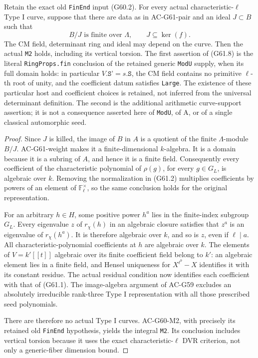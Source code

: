 \begin{theorem}
\label{AC-G61}
Retain the exact old \texttt{FinEnd} input (G60.2).
For every actual characteristic-\(\ell\) Type I curve, suppose
that there are data as in AC-G61-pair and an ideal \(J\subset B\)
such that
\[
        B/J\text{ is finite over }\Lambda,
        \qquad J\subseteq\ker(f).
 \tag{G61.8}
\]
The CM field, determinant ring and ideal may depend on the curve.
Then the actual \texttt{M2} holds, including its vertical torsion.
The first assertion of (G61.8) is the literal
\texttt{RingProps.fin} conclusion of the retained generic
\texttt{ModU} supply, when its full domain holds: in particular
\(V.\texttt{S'}=s.\texttt S\), the CM field contains no
primitive \(\ell\)-th root of unity, and the coefficient datum
satisfies \texttt{Large}.  The existence of these particular
host and coefficient choices is retained, not inferred from
the universal determinant definition.  The second is the additional arithmetic
curve-support assertion; it is not a consequence asserted here
of \texttt{ModU}, of A, or of a single classical automorphic seed.
\end{theorem}
\begin{proof}
Since \(J\) is killed, the image of \(B\) in \(A\) is a
quotient of the finite \(\Lambda\)-module \(B/J\).
AC-G61-weight makes it a finite-dimensional \(k\)-algebra.
It is a domain because it is a subring of \(A\), and hence it
is a finite field.  Consequently every coefficient of the
characteristic polynomial of \(\rho(g)\), for every
\(g\in G_L\), is algebraic over \(k\).
Removing the normalization in (G61.2) multiplies coefficients
by powers of an element of \(\mathbb F_\ell^\times\), so
the same conclusion holds for the original representation.

For an arbitrary \(h\in H\), some positive power \(h^a\)
lies in the finite-index subgroup \(G_L\).
Every eigenvalue \(z\) of \(r_\chi(h)\) in an algebraic
closure satisfies that \(z^a\) is an eigenvalue of
\(r_\chi(h^a)\).  It is therefore algebraic over \(k\),
and so is \(z\), even if \(\ell\mid a\).
All characteristic-polynomial coefficients at \(h\) are
algebraic over \(k\).  The elements of \(V=k'[[t]]\)
algebraic over its finite coefficient field belong to \(k'\):
an algebraic element lies in a finite field, and Hensel uniqueness
for \(X^{\ell^b}-X\) identifies it with its constant residue.
The actual residual condition now identifies each coefficient
with that of (G61.1).  The image-algebra argument of AC-G59
excludes an absolutely irreducible rank-three Type I representation
with all those prescribed seed polynomials.

There are therefore no actual Type I curves.  AC-G60-M2, with
precisely its retained old \texttt{FinEnd} hypothesis, yields
the integral \texttt{M2}.  Its conclusion includes vertical
torsion because it uses the exact characteristic-\(\ell\)
DVR criterion, not only a generic-fiber dimension bound.
\end{proof}

